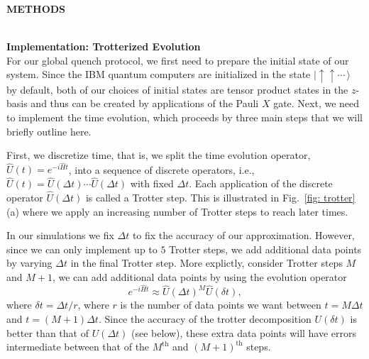 \documentclass[twocolumn,showpacs,preprintnumbers,nofootinbib,amsmath,aps,pra,longbibliography,amssymb,superscriptaddress]{revtex4-1}
\newcommand{\ra}{\rangle}
\begin{document}
\hfill

\begin{center}
	\uppercase{\bf Methods}
\end{center}




\hfill\\\textbf{Implementation: Trotterized Evolution}\\
For our global quench protocol, we first need to prepare the initial state of our system. Since the IBM quantum computers are initialized in the state $|\!\uparrow \uparrow \!\cdots \,\ra$ by default, both of our choices of initial states are tensor product states in the $z$-basis and thus can be created by applications of the Pauli $X$ gate. Next, we need to implement the time evolution, which proceeds by three main steps that we will briefly outline here. 

First, we discretize time, that is, we split the time evolution operator, $\hat{U}(t) = e^{-i\hat{H}t}$, into a sequence of discrete operators, i.e., $\hat{U}(t) = \hat{U}(\Delta t) \cdots \hat{U}(\Delta t)$ with fixed $\Delta t$. Each application of the discrete operator $\hat{U}(\Delta t)$ is called a Trotter step. This is illustrated in Fig.~\ref{fig: trotter}(a) where we apply an increasing number of Trotter steps to reach later times.

In our simulations we fix $\Delta t$ to fix the accuracy of our approximation. However, since we can only implement up to $5$ Trotter steps, we add additional data points by varying $\Delta t$ in the final Trotter step. More explictly, consider Trotter steps $M$ and $M+1$, we can add additional data points by using the evolution operator
\begin{equation}
e^{-i\hat{H}t} \approx \hat{U}(\Delta t)^M \hat{U}(\delta t),
\end{equation}
where $\delta t = \Delta t / r$, where $r$ is the number of data points we want between $t=M\Delta t$ and $t = (M+1)\Delta t$. Since the accuracy of the trotter decomposition $U(\delta t)$ is better than that of $U(\Delta t)$ (see below), these extra data points will have errors intermediate between that of the $M^\text{th}$ and $(M+1)^\text{th}$ steps.
\end{document}
